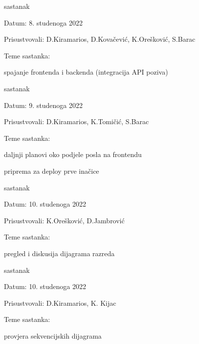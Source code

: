 \begin{packed_enum}
			\item  sastanak
			\item[] \begin{packed_item}
				\item Datum: 8. studenoga 2022
				\item Prisustvovali: D.Kiramarios, D.Kovačević, K.Orešković, S.Barac
				\item Teme sastanka:
				\begin{packed_item}
					\item spajanje frontenda i backenda (integracija API poziva)
				\end{packed_item}
			\end{packed_item}

			\item  sastanak
			\item[] \begin{packed_item}
				\item Datum: 9. studenoga 2022
				\item Prisustvovali: D.Kiramarios, K.Tomičić, S.Barac
				\item Teme sastanka:
				\begin{packed_item}
					\item daljnji planovi oko podjele posla na frontendu
					\item priprema za deploy prve inačice
				\end{packed_item}
			\end{packed_item}

			\item  sastanak
			\item[] \begin{packed_item}
				\item Datum: 10. studenoga 2022
				\item Prisustvovali: K.Orešković, D.Jambrović
				\item Teme sastanka:
				\begin{packed_item}
					\item pregled i diskusija dijagrama razreda
				\end{packed_item}
			\end{packed_item}

			\item  sastanak
			\item[] \begin{packed_item}
				\item Datum: 10. studenoga 2022
				\item Prisustvovali: D.Kiramarios, K. Kijac
				\item Teme sastanka:
				\begin{packed_item}
					\item provjera sekvencijskih dijagrama
				\end{packed_item}
			\end{packed_item}
			
		\end{packed_enum}
		
